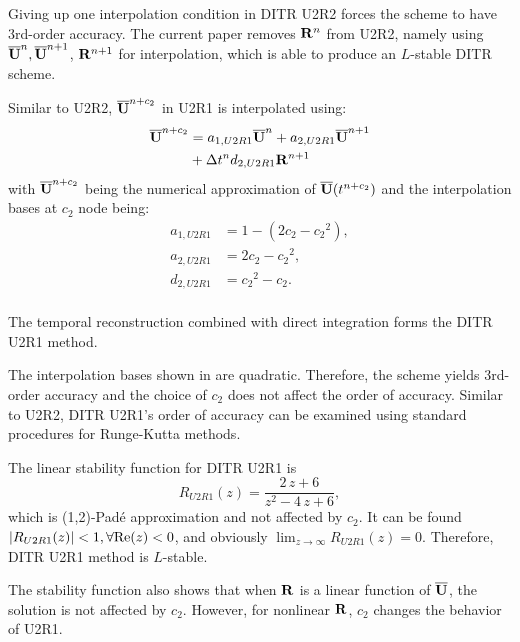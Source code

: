 Giving up one interpolation condition in DITR U2R2
forces the scheme to have 3rd-order accuracy.
The current paper removes $\mathbf{R}^{n}$ from U2R2, namely
using $\overline{\mathbf{U}}^{n},\overline{\mathbf{U}}^{n+1}$, $\mathbf{R}^{n+1}$ for interpolation,
which is able to produce an $L$-stable DITR scheme.

Similar to U2R2, $\overline{\mathbf{U}}^{n+c_2}$ in U2R1 is interpolated using:
\begin{equation}
    \begin{aligned}
        \label{eq:TRU2R1}
        \overline{\mathbf{U}}^{n+c_2} & =
        a_{1,U2R1}\overline{\mathbf{U}}^{n} +
        a_{2,U2R1}\overline{\mathbf{U}}^{n + 1}
        \\ & +
        {\Delta} t^n d_{2,U2R1}\mathbf{R}^{n + 1}
    \end{aligned}
\end{equation}
with $\overline{\mathbf{U}}^{n+c_2}$ being
the numerical approximation
of $\overline{\mathbf{U}}(t^{n+c_2})$
and the interpolation bases at $c_2$ node being:
\begin{equation}
    \begin{aligned}
        a_{1,U2R1} & = 1 - (2c_2 - {c_2}^2), \\
        a_{2,U2R1} & = 2c_2 - {c_2}^2,       \\
        d_{2,U2R1} & = {c_2}^2 - {c_2}.      \\
    \end{aligned}
    \label{eq:interpU2R1}
\end{equation}

The temporal reconstruction 
combined with direct integration 
forms the DITR U2R1 method.

The interpolation bases shown in 
are quadratic.
Therefore, the scheme yields 3rd-order accuracy
and the choice of $c_2$ does not affect the order of accuracy.
Similar to U2R2, DITR U2R1's order of accuracy can
be examined using
standard procedures for
Runge-Kutta methods\cite{wanner1996solving}.

The linear stability function for DITR U2R1 is
\begin{equation}
    \label{eq:stabilityFuncU2R1}
    R_{U2R1}(z) = \frac{2\,z+6}{z^2-4\,z+6},
\end{equation}
which is (1,2)-Pad{\'e} approximation and not affected by $c_2$.
It can be found $|R_{U2R1}(z)| < 1, \forall \mathrm{Re}(z) < 0$,
and obviously $\lim_{z\rightarrow\infty}R_{U2R1}(z) = 0$.
Therefore, DITR U2R1 method is $L$-stable.

The stability function also
shows that when $\mathbf{R}$ is a linear function of $\overline{\mathbf{U}}$,
the solution is not
affected by $c_2$.
However, for nonlinear $\mathbf{R}$,
$c_2$ changes the behavior of U2R1.


